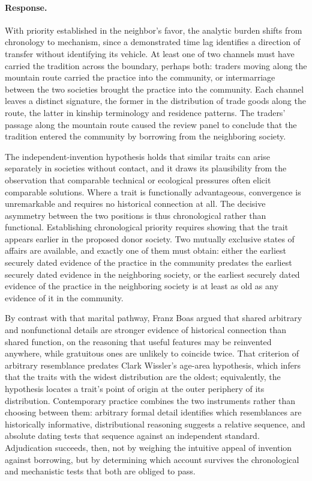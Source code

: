 \documentclass[11pt]{article}
\begin{document}
\paragraph{Response.} {\small With priority established in the neighbor's favor, the analytic burden shifts from chronology to mechanism, since a demonstrated time lag identifies a direction of transfer without identifying its vehicle. At least one of two channels must have carried the tradition across the boundary, perhaps both: traders moving along the mountain route carried the practice into the community, or intermarriage between the two societies brought the practice into the community. Each channel leaves a distinct signature, the former in the distribution of trade goods along the route, the latter in kinship terminology and residence patterns. The traders' passage along the mountain route caused the review panel to conclude that the tradition entered the community by borrowing from the neighboring society.

The independent-invention hypothesis holds that similar traits can arise separately in societies without contact, and it draws its plausibility from the observation that comparable technical or ecological pressures often elicit comparable solutions. Where a trait is functionally advantageous, convergence is unremarkable and requires no historical connection at all. The decisive asymmetry between the two positions is thus chronological rather than functional. Establishing chronological priority requires showing that the trait appears earlier in the proposed donor society. Two mutually exclusive states of affairs are available, and exactly one of them must obtain: either the earliest securely dated evidence of the practice in the community predates the earliest securely dated evidence in the neighboring society, or the earliest securely dated evidence of the practice in the neighboring society is at least as old as any evidence of it in the community.

By contrast with that marital pathway, Franz Boas argued that shared arbitrary and nonfunctional details are stronger evidence of historical connection than shared function, on the reasoning that useful features may be reinvented anywhere, while gratuitous ones are unlikely to coincide twice. That criterion of arbitrary resemblance predates Clark Wissler's age-area hypothesis, which infers that the traits with the widest distribution are the oldest; equivalently, the hypothesis locates a trait's point of origin at the outer periphery of its distribution. Contemporary practice combines the two instruments rather than choosing between them: arbitrary formal detail identifies which resemblances are historically informative, distributional reasoning suggests a relative sequence, and absolute dating tests that sequence against an independent standard. Adjudication succeeds, then, not by weighing the intuitive appeal of invention against borrowing, but by determining which account survives the chronological and mechanistic tests that both are obliged to pass.

}
\end{document}
